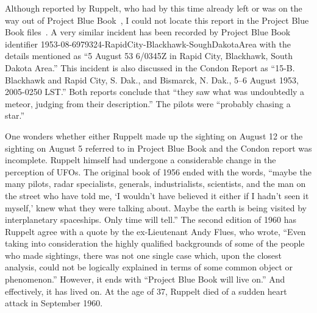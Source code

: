 Although reported by Ruppelt, who had by this time already left or was on the way out of Project Blue Book~\cite{Ruppelt2011May},
I could not locate this report in the Project Blue Book files~\cite{bluebook-directory-listing}.
A very similar incident has been recorded by Project Blue Book identifier 1953-08-6979324-RapidCity-Blackhawk-SoughDakotaArea
with the details mentioned as ``5 August 53 6/0345Z in Rapid City, Blackhawk, South Dakota Area.''
This incident is also discussed in the Condon Report as
``15-B. Blackhawk and Rapid City, S. Dak., and Bismarck, N. Dak., 5--6 August 1953, 2005-0250 LST.''
Both reports conclude that ``they saw what was undoubtedly a meteor, judging from their description.'' The pilots were ``probably chasing a star.''

One wonders whether either Ruppelt made up the sighting on August 12 or the sighting on August 5 referred to in Project Blue Book and the Condon report was incomplete. Ruppelt himself had undergone a considerable change in the perception of UFOs. The original book of 1956 ended with the words, ``maybe the many pilots, radar specialists, generals, industrialists, scientists, and the man on the street who have told me, `I wouldn't have believed it either if I hadn't seen it myself,' knew what they were talking about. Maybe the earth is being visited by interplanetary spaceships. Only time will tell.'' The second edition of 1960 has Ruppelt agree with a quote by the ex-Lieutenant Andy Flues, who wrote, ``Even taking into consideration the highly qualified backgrounds of some of the people who made sightings, there was not one single case which, upon the closest analysis, could not be logically explained in terms of some common object or phenomenon.''
However, it ends with ``Project Blue Book will live on.'' And effectively, it has lived on.
At the age of 37, Ruppelt died of a  sudden  heart attack in September 1960.

